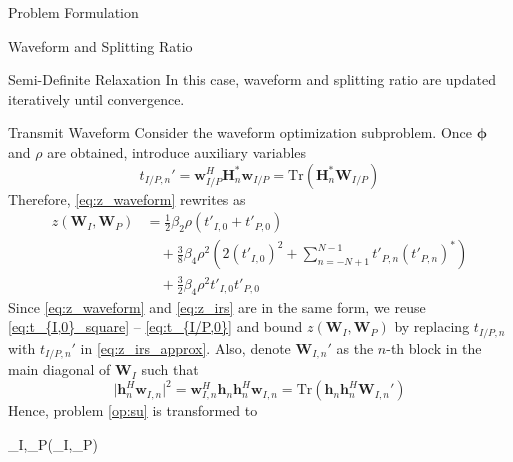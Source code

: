 \documentclass{IEEEtran}
\begin{document}
\begin{section}{Problem Formulation}
\begin{subsection}{Waveform and Splitting Ratio}
		\begin{subsubsection}{Semi-Definite Relaxation}
			In this case, waveform and splitting ratio are updated iteratively until convergence.
			\begin{paragraph}{Transmit Waveform}
				Consider the waveform optimization subproblem. Once $\boldsymbol{\phi}$ and $\rho$ are obtained, introduce auxiliary variables
				\begin{equation}\label{eq:t'}
					t_{I/P,n}' = \boldsymbol{w}_{I/P}^H \boldsymbol{H}_n^* \boldsymbol{w}_{I/P} = \mathrm{Tr}(\boldsymbol{H}_n^*\boldsymbol{W}_{I/P})
				\end{equation}
				Therefore, \ref{eq:z_waveform} rewrites as
				\begin{equation}\label{eq:z_waveform}
					\begin{split}
						z(\boldsymbol{W}_I,\boldsymbol{W}_P)
						&=\frac{1}{2} \beta_2 \rho (t'_{I,0}+t'_{P,0})\\
						&\quad+\frac{3}{8} \beta_4 \rho^2 \left(2(t'_{I,0})^2 + \sum_{n=-N+1}^{N-1}{t'_{P,n}(t'_{P,n})^*}\right)\\
						&\quad+\frac{3}{2} \beta_4 \rho^2 t'_{I,0}t'_{P,0}
					\end{split}
				\end{equation}
				Since \ref{eq:z_waveform} and \ref{eq:z_irs} are in the same form, we reuse \ref{eq:t_{I,0}_square} -- \ref{eq:t_{I/P,0}} and bound $z(\boldsymbol{W}_I,\boldsymbol{W}_P)$ by replacing $t_{I/P,n}$ with $t_{I/P,n}'$ in \ref{eq:z_irs_approx}. Also, denote $\boldsymbol{W}_{I,n}'$ as the $n$-th block in the main diagonal of $\boldsymbol{W}_{I}$ such that
				\begin{equation}
					\lvert{\boldsymbol{h}_n^H\boldsymbol{w}_{I,n}}\rvert^2=\boldsymbol{w}_{I,n}^H\boldsymbol{h}_n\boldsymbol{h}_n^H\boldsymbol{w}_{I,n}=\mathrm{Tr}(\boldsymbol{h}_n\boldsymbol{h}_n^H\boldsymbol{W}_{I,n}')
				\end{equation}
				Hence, problem \ref{op:su} is transformed to
				\begin{maxi!}
					{\boldsymbol{W}_I,_P}{(_I,_P)}{\label{op:su_waveform}}{\label{eq:su_waveform_target}}

\end{maxi!}
\end{paragraph}
\end{subsubsection}
\end{subsection}
\end{section}
\end{document}
